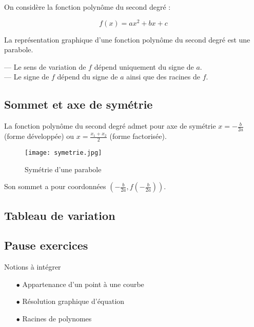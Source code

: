 \documentclass[a4paper,12pt]{article}
\begin{document}
On considère la fonction polynôme du second degré :

\[
f(x) = ax^2 + bx + c
\]

La représentation graphique d'une fonction polynôme du second degré est une parabole.

— Le sens de variation de $f$ dépend uniquement du signe de $a$. \\
— Le signe de $f$ dépend du signe de $a$ ainsi que des racines de $f$.

\subsection*{Sommet et axe de symétrie}

La fonction polynôme du second degré admet pour axe de symétrie $x = -\frac{b}{2a}$ (forme développée) ou $x = \frac{x_1 + x_2}{2}$ (forme factorisée).

\begin{figure}[H]
  \centering
  \texttt{[image: symetrie.jpg]}
  \caption{\label{} Symétrie d'une parabole}
\end{figure}

Son sommet a pour coordonnées $\left(-\frac{b}{2a}, f\left(-\frac{b}{2a}\right)\right)$.

\subsection*{Tableau de variation}


\subsection*{Pause exercices}

\begin{tcolorbox}
Notions à intégrer

\begin{itemize}[noitemsep]
  \item[$\bullet$] Appartenance d'un point à une courbe
  \item[$\bullet$] Résolution graphique d'équation
  \item[$\bullet$] Racines de polynomes
\end{itemize}

\end{tcolorbox}
\end{document}
